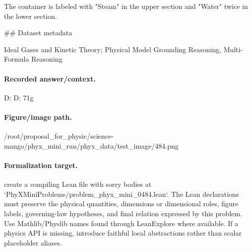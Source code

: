 The container is labeled with "Steam" in the upper section and "Water" twice in the lower section.

\#\# Dataset metadata

Ideal Gases and Kinetic Theory; Physical Model Grounding Reasoning, Multi-Formula Reasoning

\paragraph{Recorded answer/context.}
D: D: 71g

\paragraph{Figure/image path.}
/root/proposal\_for\_physic/science-mango/phyx\_mini\_run/phyx\_data/test\_image/484.png

\paragraph{Formalization target.}
create a compiling Lean file with sorry bodies at `PhyXMiniProblems/problem\_phyx\_mini\_0484.lean`. The Lean declarations must preserve the physical quantities, dimensions or dimensional roles, figure labels, governing-law hypotheses, and final relation expressed by this problem.
Use Mathlib/Physlib names found through LeanExplore where available. If a physics API is missing, introduce faithful local abstractions rather than scalar placeholder aliases.

